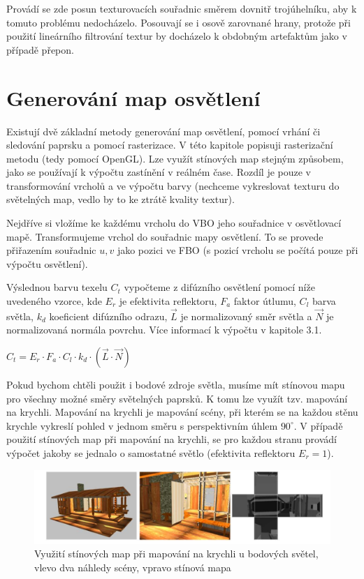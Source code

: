 \documentclass[11pt,twoside,a4paper]{book}
\begin{document}
Provádí se zde posun texturovacích souřadnic směrem dovnitř trojúhelníku, aby k tomuto problému nedocházelo. Posouvají se i osově zarovnané hrany, protože při použití lineárního filtrování textur by docházelo k obdobným artefaktům jako v případě přepon.

\section{Generování map osvětlení}
Existují dvě základní metody generování map osvětlení, pomocí vrhání či sledování paprsku a pomocí rasterizace. V této kapitole popisuji rasterizační metodu (tedy pomocí OpenGL). Lze využít stínových map stejným způsobem, jako se používají k výpočtu zastínění v reálném čase. Rozdíl je pouze v transformování vrcholů a ve výpočtu barvy (nechceme vykreslovat texturu do světelných map, vedlo by to ke ztrátě kvality textur).

Nejdříve si vložíme ke každému vrcholu do VBO jeho souřadnice v osvětlovací mapě. Transformujeme vrchol do souřadnic mapy osvětlení. To se provede přiřazením souřadnic $u, v$ jako pozici ve FBO (s pozicí vrcholu se počítá pouze při výpočtu osvětlení).

Výslednou barvu texelu $C_t$ vypočteme z difúzního osvětlení pomocí níže uvedeného vzorce, kde $E_r$ je efektivita reflektoru, $F_a$ faktor útlumu, $C_l$ barva světla, $k_d$ koeficient difúzního odrazu, $\vec{L}$ je normalizovaný směr světla a $\vec{N}$ je normalizovaná normála povrchu. Více informací k výpočtu v kapitole 3.1.
\begin{center}
$C_t = E_r \cdot F_a \cdot C_l \cdot k_d \cdot (\vec{L} \cdot \vec{N})$
\end{center}

Pokud bychom chtěli použit i bodové zdroje světla, musíme mít stínovou mapu pro všechny možné směry světelných paprsků. K tomu lze využít tzv. mapování na krychli. Mapování na krychli je mapování scény, při kterém se na každou stěnu krychle vykreslí pohled v jednom směru s perspektivním úhlem $90^{\circ}$. V případě použití stínových map při mapování na krychli, se pro každou stranu provádí výpočet jakoby se jednalo o samostatné světlo (efektivita reflektoru $E_r = 1$).

\begin{center}
\begin{figure}[h]
\includegraphics[width=150mm]{figures/cubemap.png}
\caption{Využití stínových map při mapování na krychli u bodových světel, vlevo dva náhledy scény, vpravo stínová mapa}
\end{figure}
\end{center}
\end{document}
